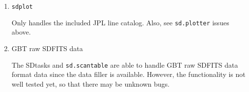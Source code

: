 \begin{enumerate}
\item {\tt sdplot}

  Only handles the included JPL line catalog.  Also, see {\tt sd.plotter} issues above.

\item GBT raw SDFITS data

  The SDtasks and {\tt sd.scantable} are able to handle GBT raw SDFITS data format data 
  since the data filler is available. However, the functionality is not well 
  tested yet, so that there may be unknown bugs.  

%

\end{enumerate}

